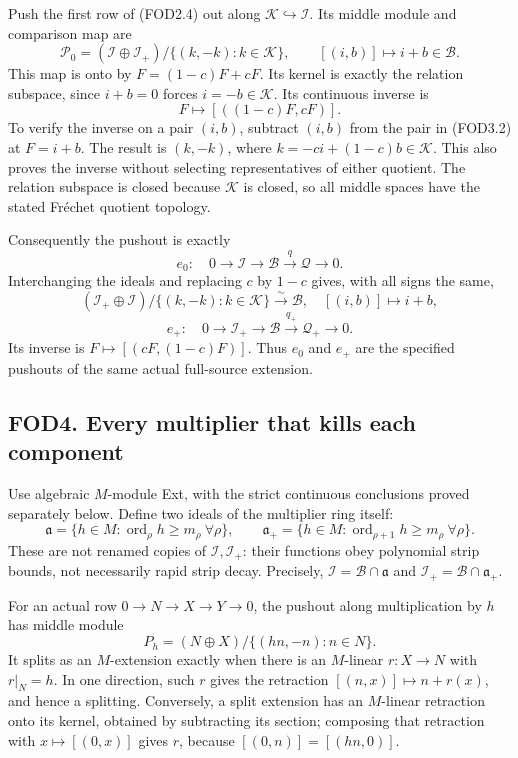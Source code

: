 Push the first row of (FOD2.4) out along
\(\mathcal K\hookrightarrow\mathcal I\). Its middle module and
comparison map are \[
\mathcal P_0=(\mathcal I\oplus\mathcal I_+)/\{(k,-k):k\in\mathcal K\},
\qquad [(i,b)]\longmapsto i+b\in\mathcal B.
\tag{FOD3.1}
\] This map is onto by \(F=(1-c)F+cF\). Its kernel is exactly the
relation subspace, since \(i+b=0\) forces \(i=-b\in\mathcal K\). Its
continuous inverse is \[
F\longmapsto[((1-c)F,cF)].
\tag{FOD3.2}
\] To verify the inverse on a pair \((i,b)\), subtract \((i,b)\) from
the pair in (FOD3.2) at \(F=i+b\). The result is \((k,-k)\), where
\(k=-ci+(1-c)b\in\mathcal K\). This also proves the inverse without
selecting representatives of either quotient. The relation subspace is
closed because \(\mathcal K\) is closed, so all middle spaces have the
stated Fréchet quotient topology.

Consequently the pushout is exactly \[
e_0:\quad0\to\mathcal I\to\mathcal B\xrightarrow q\mathcal Q\to0.
\tag{FOD3.3}
\] Interchanging the ideals and replacing \(c\) by \(1-c\) gives, with
all signs the same, \[
(\mathcal I_+\oplus\mathcal I)/\{(k,-k):k\in\mathcal K\}
\xrightarrow{\sim}\mathcal B,\quad[(i,b)]\mapsto i+b,
\] \[
e_+:\quad0\to\mathcal I_+\to\mathcal B\xrightarrow{q_+}\mathcal Q_+\to0.
\tag{FOD3.4}
\] Its inverse is \(F\mapsto[(cF,(1-c)F)]\). Thus \(e_0\) and \(e_+\)
are the specified pushouts of the same actual full-source extension.

\subsection{FOD4. Every multiplier that kills each
component}\label{fod4.-every-multiplier-that-kills-each-component}

Use algebraic \(M\)-module Ext, with the strict continuous conclusions
proved separately below. Define two ideals of the multiplier ring
itself: \[
\mathfrak a=\{h\in M:\operatorname{ord}_\rho h\ge m_\rho\ \forall\rho\},
\qquad
\mathfrak a_+=\{h\in M:\operatorname{ord}_{\rho+1}h\ge m_\rho\ \forall\rho\}.
\tag{FOD4.1}
\] These are not renamed copies of \(\mathcal I,\mathcal I_+\): their
functions obey polynomial strip bounds, not necessarily rapid strip
decay. Precisely, \(\mathcal I=\mathcal B\cap\mathfrak a\) and
\(\mathcal I_+=\mathcal B\cap\mathfrak a_+\).

For an actual row \(0\to N\to X\to Y\to0\), the pushout along
multiplication by \(h\) has middle module \[
P_h=(N\oplus X)/\{(hn,-n):n\in N\}.
\tag{FOD4.2}
\] It splits as an \(M\)-extension exactly when there is an \(M\)-linear
\(r:X\to N\) with \(r|_N=h\). In one direction, such \(r\) gives the
retraction \([(n,x)]\mapsto n+r(x)\), and hence a splitting. Conversely,
a split extension has an \(M\)-linear retraction onto its kernel,
obtained by subtracting its section; composing that retraction with
\(x\mapsto[(0,x)]\) gives \(r\), because \([(0,n)]=[(hn,0)]\).

